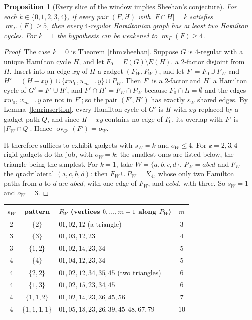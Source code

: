 \documentclass[11pt,a4paper]{article}
\newtheorem{proposition}[theorem]{Proposition}
\theoremstyle{definition}
\theoremstyle{remark}
\newcommand{\ov}{\operatorname{ov}}
\begin{document}
\begin{proposition}[Every slice of the window implies Sheehan's conjecture]\label{prop:slices}
For each $k\in\{0,1,2,3,4\}$, if every pair $(F,H)$ with $|F\cap H|=k$ satisfies $\ov_\Gamma(F)\ge5$, then every $4$-regular Hamiltonian graph has at least two Hamilton cycles. For $k=1$ the hypothesis can be weakened to $\ov_\Gamma(F)\ge4$.
\end{proposition}

\begin{proof}
The case $k=0$ is Theorem~\ref{thm:sheehan}. Suppose $G$ is $4$-regular with a unique Hamilton cycle $H$, and let $F_0=E(G)\setminus E(H)$, a 2-factor disjoint from $H$. Insert into an edge $xy$ of $H$ a gadget $(F_W,P_W)$, and let $F'=F_0\cup F_W$ and $H'=(H-xy)\cup\{xw_0,w_{m-1}y\}\cup P_W$. Then $F'$ is a 2-factor and $H'$ a Hamilton cycle of $G'=F'\cup H'$, and $F'\cap H'=F_W\cap P_W$ because $F_0\cap H=\emptyset$ and the edges $xw_0$, $w_{m-1}y$ are not in $F'$; so the pair $(F',H')$ has exactly $s_W$ shared edges. By Lemma~\ref{lem:insertion}, every Hamilton cycle of $G'$ is $H$ with $xy$ replaced by a gadget path $Q$, and since $H-xy$ contains no edge of $F_0$, its overlap with $F'$ is $|F_W\cap Q|$. Hence $\ov_{G'}(F')=o_W$.

It therefore suffices to exhibit gadgets with $s_W=k$ and $o_W\le4$. For $k=2,3,4$ rigid gadgets do the job, with $o_W=k$; the smallest ones are listed below, the triangle being the simplest. For $k=1$, take $W=\{a,b,c,d\}$, $P_W=abcd$ and $F_W$ the quadrilateral $(a,c,b,d)$: then $F_W\cup P_W=K_4$, whose only two Hamilton paths from $a$ to $d$ are $abcd$, with one edge of $F_W$, and $acbd$, with three. So $s_W=1$ and $o_W=3$.
\end{proof}

\begin{center}
\begin{tabular}{cclc}
\toprule
$s_W$ & pattern & $F_W$ (vertices $0,\dots,m-1$ along $P_W$) & $m$\\
\midrule
$2$ & $\{2\}$ & $01,02,12$ (a triangle) & $3$\\
$3$ & $\{3\}$ & $01,03,12,23$ & $4$\\
$3$ & $\{1,2\}$ & $01,02,14,23,34$ & $5$\\
$4$ & $\{4\}$ & $01,04,12,23,34$ & $5$\\
$4$ & $\{2,2\}$ & $01,02,12,34,35,45$ (two triangles) & $6$\\
$4$ & $\{1,3\}$ & $01,02,15,23,34,45$ & $6$\\
$4$ & $\{1,1,2\}$ & $01,02,14,23,36,45,56$ & $7$\\
$4$ & $\{1,1,1,1\}$ & $01,05,18,23,26,39,45,48,67,79$ & $10$\\
\bottomrule
\end{tabular}
\end{center}
\end{document}
